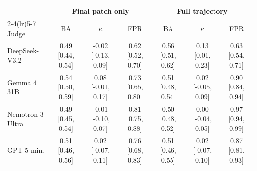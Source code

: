 \begin{tabular}{lcccccc}
\toprule
 & \multicolumn{3}{c}{Final patch only} & \multicolumn{3}{c}{Full trajectory} \\
\cmidrule(lr){2-4}\cmidrule(lr){5-7}
Judge & BA & $\kappa$ & FPR & BA & $\kappa$ & FPR \\
\midrule
DeepSeek-V3.2 & 0.49 {\scriptsize[0.44, 0.54]} & -0.02 {\scriptsize[-0.13, 0.09]} & 0.62 {\scriptsize[0.52, 0.70]} & 0.56 {\scriptsize[0.51, 0.62]} & 0.13 {\scriptsize[0.01, 0.23]} & 0.63 {\scriptsize[0.54, 0.71]} \\
Gemma 4 31B & 0.54 {\scriptsize[0.50, 0.59]} & 0.08 {\scriptsize[-0.01, 0.17]} & 0.73 {\scriptsize[0.65, 0.80]} & 0.51 {\scriptsize[0.48, 0.54]} & 0.02 {\scriptsize[-0.05, 0.09]} & 0.90 {\scriptsize[0.84, 0.94]} \\
Nemotron 3 Ultra & 0.49 {\scriptsize[0.45, 0.54]} & -0.01 {\scriptsize[-0.10, 0.07]} & 0.81 {\scriptsize[0.75, 0.88]} & 0.50 {\scriptsize[0.48, 0.52]} & 0.00 {\scriptsize[-0.04, 0.05]} & 0.97 {\scriptsize[0.94, 0.99]} \\
GPT-5-mini & 0.51 {\scriptsize[0.46, 0.56]} & 0.02 {\scriptsize[-0.07, 0.11]} & 0.76 {\scriptsize[0.68, 0.83]} & 0.51 {\scriptsize[0.46, 0.55]} & 0.02 {\scriptsize[-0.07, 0.10]} & 0.87 {\scriptsize[0.81, 0.93]} \\
\bottomrule
\end{tabular}
